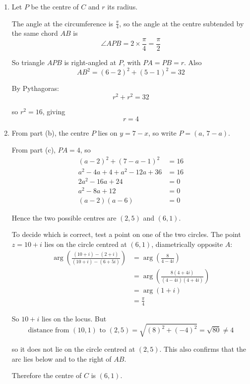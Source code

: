 \documentclass[leqno]{article}
\begin{document}
\begin{enumerate}[
  label=\textbf{\arabic*.},
  leftmargin=*,
  topsep=0pt,
  partopsep=0pt,
  parsep=0pt
]
\begin{djsSolution}
\begin{enumerate}[label=\textbf{(\alph*)}]
  Therefore the centre lies on the line \(y=7-x\).

  \item Let \(P\) be the centre of \(C\) and \(r\) its radius.

  The angle at the circumference is \(\frac{\pi}{4}\), so the angle at the centre subtended by the same chord \(AB\) is
  \[
  \angle APB=2\times \frac{\pi}{4}=\frac{\pi}{2}
  \]

  So triangle \(APB\) is right-angled at \(P\), with \(PA=PB=r\). Also
  \[
  AB^2=(6-2)^2+(5-1)^2=32
  \]

  By Pythagoras:
  \[
  r^2+r^2=32
  \]

  so \(r^2=16\), giving
  \[
  r=4
  \]

  \item From part (b), the centre \(P\) lies on \(y=7-x\), so write \(P=(a,\,7-a)\).

  From part (c), \(PA=4\), so
  \begin{align*}
  (a-2)^2+(7-a-1)^2&=16\\
  a^2-4a+4+a^2-12a+36&=16\\
  2a^2-16a+24&=0\\
  a^2-8a+12&=0\\
  (a-2)(a-6)&=0
  \end{align*}

  Hence the two possible centres are \((2,5)\) and \((6,1)\).

  To decide which is correct, test a point on one of the two circles. The point \(z=10+i\) lies on the circle centred at \((6,1)\), diametrically opposite \(A\):
  \begin{align*}
  \arg\left(\frac{(10+i)-(2+i)}{(10+i)-(6+5i)}\right)
  &=\arg\left(\frac{8}{4-4i}\right)\\
  &=\arg\left(\frac{8(4+4i)}{(4-4i)(4+4i)}\right)\\
  &=\arg(1+i)\\
  &=\frac{\pi}{4}
  \end{align*}

  So \(10+i\) lies on the locus. But
  \[
  \text{distance from }(10,1)\text{ to }(2,5)=\sqrt{(8)^2+(-4)^2}=\sqrt{80}\ne 4
  \]

  so it does not lie on the circle centred at \((2,5)\). This also confirms that the arc lies below and to the right of \(AB\).

  Therefore the centre of \(C\) is \((6,1)\).
\end{enumerate}
\end{djsSolution}


\end{enumerate}
\end{document}
